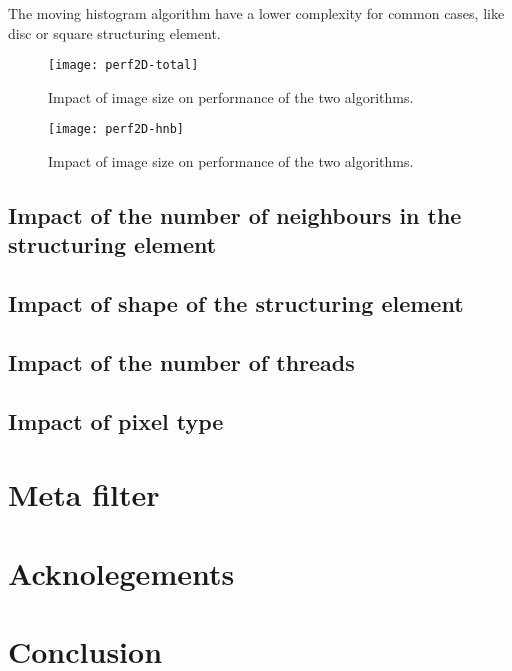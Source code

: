\documentclass{InsightArticle}
\begin{document}
The moving histogram algorithm have a lower complexity for common cases, like
disc or square structuring element.

\begin{figure}[htbp]
\centering
\texttt{[image: perf2D-total]}
\caption{Impact of image size on performance of the two algorithms.\label{perf2D-total}}
\end{figure}

\begin{figure}[htbp]
\centering
\texttt{[image: perf2D-hnb]}
\caption{Impact of image size on performance of the two algorithms.\label{perf2D-hnb}}
\end{figure}

  \subsection{Impact of the number of neighbours in the structuring element}

  \subsection{Impact of shape of the structuring element}

  \subsection{Impact of the number of threads}

  \subsection{Impact of pixel type}

\section{Meta filter}

\section{Acknolegements}

\section{Conclusion}

\end{document}
